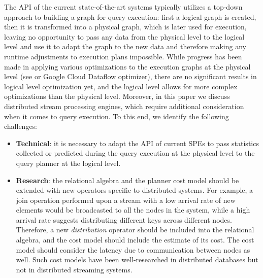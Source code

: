 The API of the current state-of-the-art systems typically utilizes a top-down approach to building a graph for query execution: first a logical graph is created, then it is transformed into a physical graph, which is later used for execution, leaving no opportunity to pass any data from the physical level to the logical level and use it to adapt the graph to the new data and therefore making any runtime adjustments to execution plans impossible. While progress has been made in applying various optimizations to the execution graphs at the physical level (see \cite{grulich2020grizzly} or Google Cloud Dataflow optimizer), there are no significant results in logical level optimization yet, and the logical level allows for more complex optimizations than the physical level. Moreover, in this paper we discuss distributed stream processing engines, which require additional consideration when it comes to query execution. To this end, we identify the following challenges:

\begin{itemize}
    \item \textbf{Technical}: it is necessary to adapt the API of current SPEs to pass statistics collected or predicted during the query execution at the physical level to the query planner at the logical level.
    \item \textbf{Research}: the relational algebra and the planner cost model should be extended with new operators specific to distributed systems. For example, a join operation performed upon a stream with a low arrival rate of new elements would be broadcasted to all the nodes in the system, while a high arrival rate suggests distributing different keys across different nodes. Therefore, a new \textit{distribution} operator should be included into the relational algebra, and the cost model should include the estimate of its cost. The cost model should consider the latency due to communication between nodes as well. Such cost models have been well-researched in distributed databases \cite{kossmann2000thestate} but not in distributed streaming systems.
\end{itemize}




